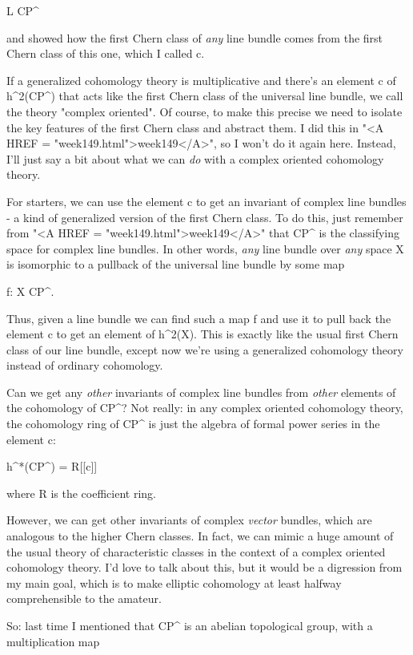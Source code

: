 L \to  CP^{\infty }

and showed how the first Chern class of \emph{any} line bundle comes from the
first Chern class of this one, which I called c.   

If a generalized cohomology theory is multiplicative and there's
an element c of h^{2}(CP^{\infty }) that acts like the first Chern class
of the universal line bundle, we call the theory "complex oriented".   
Of course, to make this precise we need to isolate the key features
of the first Chern class and abstract them.  I did this in "<A HREF = "week149.html">week149</A>",
so I won't do it again here.   Instead, I'll just say a bit about
what we can \emph{do} with a complex oriented cohomology theory.  

For starters, we can use the element c to get an invariant of complex
line bundles - a kind of generalized version of the first Chern class. 
To do this, just remember from "<A HREF = "week149.html">week149</A>" that CP^{\infty } is the
classifying space for complex line bundles.  In other words, \emph{any} line
bundle over \emph{any} space X is isomorphic to a pullback of the universal
line bundle by some map

f: X \to  CP^{\infty }.

Thus, given a line bundle we can find such a map f and use it to pull
back the element c to get an element of h^{2}(X).  This is exactly like
the usual first Chern class of our line bundle, except now we're using 
a generalized cohomology theory instead of ordinary cohomology.  

Can we get any \emph{other} invariants of complex line bundles from
\emph{other} elements of the cohomology of CP^{\infty }?  Not
really: in any complex oriented cohomology theory, the cohomology ring
of CP^{\infty } is just the algebra of formal power series in
the element c:

h^{*}(CP^{\infty }) = R[[c]]

where R is the coefficient ring.   

However, we can get other invariants of complex \emph{vector} bundles, which
are analogous to the higher Chern classes.  In fact, we can mimic a huge
amount of the usual theory of characteristic classes in the context of a
complex oriented cohomology theory.  I'd love to talk about this, but
it would be a digression from my main goal, which is to make elliptic
cohomology at least halfway comprehensible to the amateur.

So: last time I mentioned that CP^{\infty } is an abelian topological
group, with a multiplication map 

